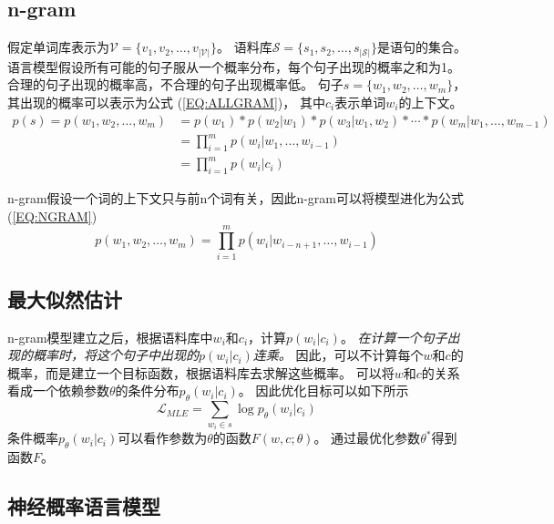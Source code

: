 \documentclass{article}
\begin{document}
\subsection{n-gram}
\label{sec:NLP:NGRAM}
假定单词库表示为$\mathcal{V} = \{v_1, v_2, \ldots, v_{|\mathcal{V}|}\}$。
语料库$\mathcal{S} = \{s_1, s_2, \ldots, s_{|\mathcal{S}|}\}$是语句的集合。
语言模型假设所有可能的句子服从一个概率分布，每个句子出现的概率之和为1。
合理的句子出现的概率高，不合理的句子出现概率低。
句子$s=\{w_1, w_2, \ldots, w_m\}$，其出现的概率可以表示为公式 (\ref{EQ:ALLGRAM})， 其中$c_i$表示单词$w_i$的上下文。
\begin{equation}
    \begin{split}
        p(s)=p(w_1,w_2,\ldots,w_m)&=p(w_1)*p(w_2|w_1)*p(w_3|w_1,w_2)*\cdots*p(w_m|w_1,\ldots,w_{m-1})\\
        &=\prod_{i=1}^{m} p(w_i|w_1,\ldots,w_{i-1})\\
        &=\prod_{i=1}^{m} p(w_i|c_i)
    \end{split}
    \label{EQ:ALLGRAM}
\end{equation}

n-gram假设一个词的上下文只与前n个词有关，因此n-gram可以将模型进化为公式(\ref{EQ:NGRAM})
\begin{equation}
    p(w_1,w_2,\ldots,w_m)=\prod_{i=1}^{m} p(w_i|w_{i-n+1},\ldots,w_{i-1})
    \label{EQ:NGRAM}
\end{equation}

\subsection{最大似然估计}
\label{sec:NLP:MLE}
n-gram模型建立之后，根据语料库中$w_i$和$c_i$，计算$p(w_i|c_i)$。
\textit{在计算一个句子出现的概率时，将这个句子中出现的$p(w_i|c_i)$连乘。}
因此，可以不计算每个$w$和$c$的概率，而是建立一个目标函数，根据语料库去求解这些概率。
可以将$w$和$c$的关系看成一个依赖参数$\theta$的条件分布$p_\theta (w_i|c_i)$。
因此优化目标可以如下所示
\begin{equation}
    \mathcal{L}_{MLE}=\sum_{w_i\in s}\log p_\theta (w_i|c_i)
    \label{EQ:NGRAM_MLE}
\end{equation}
条件概率$p_\theta (w_i|c_i)$可以看作参数为$\theta$的函数$F(w,c;\theta)$。
通过最优化参数$\theta^*$得到函数$F$。


\subsection{神经概率语言模型}
\label{sec:NLP:NPLM}
\end{document}
